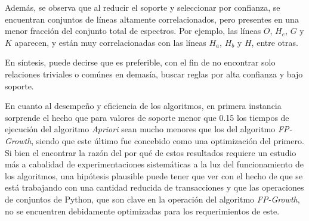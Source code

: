 Además, se observa que al reducir el soporte y seleccionar por confianza, se encuentran conjuntos de líneas altamente correlacionados, pero presentes en una menor fracción del conjunto total de espectros. Por ejemplo, las líneas $O$, $H_e$, $G$ y $K$ aparecen, y están muy correlacionadas con las líneas $H_a$, $H_b$ y $H$, entre otras.

En síntesis, puede decirse que es preferible, con el fin de no encontrar solo relaciones triviales o comúnes en demasía, buscar reglas por alta confianza y bajo soporte.

En cuanto al desempeño y eficiencia de los algoritmos, en primera instancia sorprende el hecho que para valores de soporte menor que 0.15 los tiempos de ejecución del algoritmo \textit{Apriori} sean mucho menores que los del algoritmo \textit{FP-Growth}, siendo que este último fue concebido como una optimización del primero. Si bien el encontrar la razón del por qué de estos resultados requiere un estudio más a cabalidad de experimentaciones sistemáticas a la luz del funcionamiento de los algoritmos, una hipótesis plausible puede tener que ver con el hecho de que se está trabajando con una cantidad reducida de transacciones y que las operaciones de conjuntos de Python, que son clave en la operación del algoritmo \textit{FP-Growth}, no se encuentren debidamente optimizadas para los requerimientos de este.
